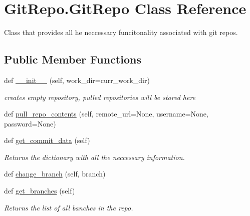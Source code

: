 \hypertarget{class_git_repo_1_1_git_repo}{}\section{Git\+Repo.\+Git\+Repo Class Reference}
\label{class_git_repo_1_1_git_repo}


Class that provides all he neccessary funcitonality associated with git repos.  


\subsection*{Public Member Functions}
\begin{DoxyCompactItemize}
\item 
\mbox{\label{class_git_repo_1_1_git_repo_a345a70fa596115c9299edcbde6f05635}} 
def \hyperlink{class_git_repo_1_1_git_repo_a345a70fa596115c9299edcbde6f05635}{\+\_\+\+\_\+init\+\_\+\+\_\+} (self, work\+\_\+dir=curr\+\_\+work\+\_\+dir)
\begin{DoxyCompactList}\small\item\em creates empty repository, pulled repositories will be stored here \end{DoxyCompactList}\item 
def \hyperlink{class_git_repo_1_1_git_repo_aca477c66170b04a8b16032f6fa95f056}{pull\+\_\+repo\+\_\+contents} (self, remote\+\_\+url=None, username=None, password=None)
\item 
def \hyperlink{class_git_repo_1_1_git_repo_ab0334d44a728881e4e96342e5c3bc135}{get\+\_\+commit\+\_\+data} (self)
\begin{DoxyCompactList}\small\item\em Returns the dictionary with all the neccessary information. \end{DoxyCompactList}\item 
def \hyperlink{class_git_repo_1_1_git_repo_ab1efc90018d20104eaeb8af9ef022c2a}{change\+\_\+branch} (self, branch)
\item 
\mbox{\label{class_git_repo_1_1_git_repo_a6fafbc00a52988697f928dcd1b293d12}} 
def \hyperlink{class_git_repo_1_1_git_repo_a6fafbc00a52988697f928dcd1b293d12}{get\+\_\+branches} (self)
\begin{DoxyCompactList}\small\item\em Returns the list of all banches in the repo. \end{DoxyCompactList}\end{DoxyCompactItemize}
